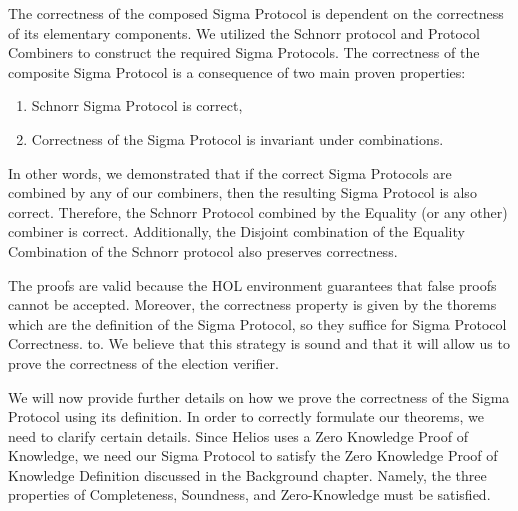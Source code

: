 The correctness of the composed Sigma Protocol is dependent on the correctness of its elementary components. We utilized the Schnorr protocol and Protocol Combiners to construct the required Sigma Protocols. The correctness of the composite Sigma Protocol is a consequence of two main proven properties:
\begin{enumerate}
    \item Schnorr Sigma Protocol is correct,
    \item Correctness of the Sigma Protocol is invariant under combinations.
\end{enumerate}
In other words, we demonstrated that if the correct Sigma Protocols are combined by any of our combiners, then the resulting Sigma Protocol is also correct. Therefore, the Schnorr Protocol combined by the Equality (or any other) combiner is correct. Additionally, the Disjoint combination of the Equality Combination of the Schnorr protocol also preserves correctness.

The proofs are valid because the HOL environment guarantees that false proofs cannot be accepted. 
Moreover, the correctness property is given by the thorems which are the definition of the Sigma Protocol, so they suffice for Sigma Protocol Correctness. 
to. We believe that this strategy is sound and that it will allow us to prove the correctness of the election verifier.

We will now provide further details on how we prove the correctness of the Sigma Protocol using its definition. In order to correctly formulate our theorems, we need to clarify certain details. Since Helios uses a Zero Knowledge Proof of Knowledge, we need our Sigma Protocol to satisfy the Zero Knowledge Proof of Knowledge Definition \cite{damgaard2010sigma} discussed in the Background chapter. Namely, the three properties of Completeness, Soundness, and Zero-Knowledge must be satisfied.

